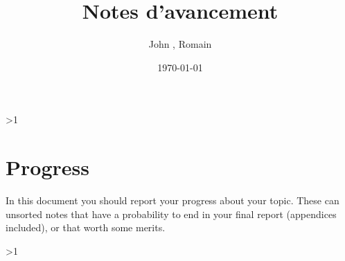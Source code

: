 \documentclass[a4paper]{article}  %
\title{Notes d'avancement}
\author{John \famName{Doe}, Romain \famName{Noël}}
\date{\today}
\newcommand{\Pathbasebib}{\PathR/ref_RN.bib,\PathR/ref_XX.bib}%
\begin{document}

\ifnum\value{levelstanda}>1
	{}%
\else
	\maketitle
\fi


\section{Progress}
	In this document you should report your progress about your topic.
	These can unsorted notes that have a probability to end in your final report (appendices included), or that worth some merits.


\ifnum\value{levelstanda}>1
	{}%
\else

	\printunsrtglossary[type=acronym]
	\printunsrtglossary[type=symbol]
\fi

\addtocounter{levelstanda}{-1}
\end{document}
